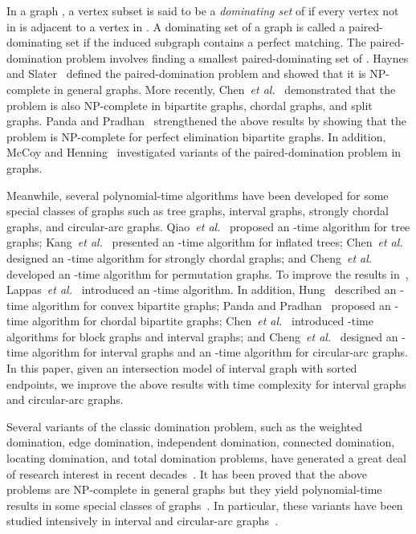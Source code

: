 \documentclass[12pt]{article}
\begin{document}
In a graph , a vertex subset  is said to be a
{\em dominating set} of  if every vertex not in  is adjacent
to a vertex in . A dominating set  of a graph  is called
a paired-dominating set if the induced subgraph  contains a
perfect matching. The paired-domination problem involves finding a
smallest paired-dominating set of . Haynes and
Slater~\cite{HS98} defined the paired-domination problem and
showed that it is NP-complete in general graphs. More recently,
Chen~{\em et al.}~\cite{Chen10} demonstrated that the problem is
also NP-complete in bipartite graphs, chordal graphs, and split
graphs. Panda and Pradhan~\cite{Panda12} strengthened the above
results by showing that the problem is NP-complete for perfect
elimination bipartite graphs. In addition, McCoy and
Henning~\cite{McCoy09} investigated variants of the
paired-domination problem in graphs.



Meanwhile, several polynomial-time algorithms have been developed
for some special classes of graphs such as tree graphs, interval
graphs, strongly chordal graphs, and circular-arc graphs.
Qiao~{\em et al.}~\cite{QKCD03} proposed an -time algorithm
for tree graphs; Kang~{\em et al.}~\cite{KSC04} presented an
-time algorithm for inflated trees; Chen~{\em et
al.}~\cite{Chen09} designed an -time algorithm for
strongly chordal graphs; and Cheng~{\em et al.}~\cite{CKS09}
developed an -time algorithm for permutation graphs. To
improve the results in~\cite{CKS09}, Lappas~{\em et
al.}~\cite{Lappas09} introduced an -time algorithm. In
addition, Hung~\cite{Hung12} described an -time algorithm
for convex bipartite graphs; Panda and Pradhan~\cite{Panda12}
proposed an -time algorithm for chordal bipartite graphs;
Chen~{\em et al.}~\cite{Chen10} introduced -time
algorithms for block graphs and interval graphs; and Cheng~{\em et
al.}~\cite{CKN07} designed an -time algorithm for interval
graphs and an -time algorithm for circular-arc graphs.
In this paper, given an intersection model of interval graph 
with sorted endpoints, we improve the above results with time
complexity  for interval graphs and circular-arc graphs.


Several variants of the classic domination problem, such as the
weighted domination, edge domination, independent domination,
connected domination, locating domination, and total domination
problems, have generated a great deal of research interest in
recent decades~\cite{Chang04,Haynes98,Haynes98-2,Hedetniemi91}. It
has been proved that the above problems are NP-complete in general
graphs but they yield polynomial-time results in some special
classes of
graphs~\cite{Bertossi88,D'Atri88,Chang97,Lu02,Ramalingam88,Chang98}.
In particular, these variants have been studied  intensively in
interval and circular-arc graphs~\cite{Ramalingam88,Chang98}.
\end{document}

